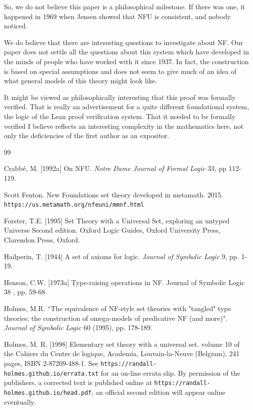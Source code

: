 \documentclass{article}
\theoremstyle{definition}
\theoremstyle{remark}
\begin{document}
{So, we do not believe this paper is a philosophical milestone.  If there was one, it happened in 1969 when Jensen showed that NFU is consistent, and nobody noticed.

We do believe that there are interesting questions to investigate about NF.  Our paper does not settle all the questions about this system which have developed in the minds of people who have worked with it since 1937.  In fact, the construction is based on special assumptions  and does not seem to give much of an idea of what general models of this theory might look like.

It might be viewed as philosophically interesting that this proof was formally verified.  That is really an advertisement for a quite different foundational system, the logic of the Lean proof verification system.   That it needed to be formally verified I believe reflects an interesting complexity in the mathematics here, not only the deficiencies of the first author as an expositor.



\newpage

\begin{thebibliography}{99}


  Crabb\'{e}, M. [1992a]
On NFU.
{\em Notre Dame Journal of Formal Logic\/} 33, pp 112-119.

  Scott Fenton.  New Foundations set theory developed in metamath.  2015.  {\tt https://us.metamath.org/nfeuni/mmnf.html}

  Forster, T.E. [1995]
Set Theory with a Universal Set, exploring an untyped Universe
Second edition. Oxford Logic Guides, Oxford University Press, Clarendon Press, Oxford.

 Hailperin, T. [1944]
A set of axioms for logic.
{\em Journal of Symbolic Logic\/} 9, pp. 1-19.



   Henson, C.W. [1973a]
Type-raising operations in NF.
Journal of Symbolic Logic 38 , pp. 59-68.

  Holmes, M.R.
``The equivalence of NF-style set theories with "tangled" type theories; the construction of omega-models of predicative NF (and more)".
{\em Journal of Symbolic Logic\/} 60 (1995), pp. 178-189.

  Holmes, M. R. [1998]
Elementary set theory with a universal set.
volume 10 of the Cahiers du Centre de logique, Academia, Louvain-la-Neuve (Belgium), 241 pages, ISBN 2-87209-488-1. See {\tt https://randall-holmes.github.io/errata.txt} for an on-line errata slip. By permission of the publishers, a corrected text is published online at {\tt https://randall-holmes.github.io/head.pdf}; an official second edition will appear online eventually.


\end{thebibliography}}
\end{document}
